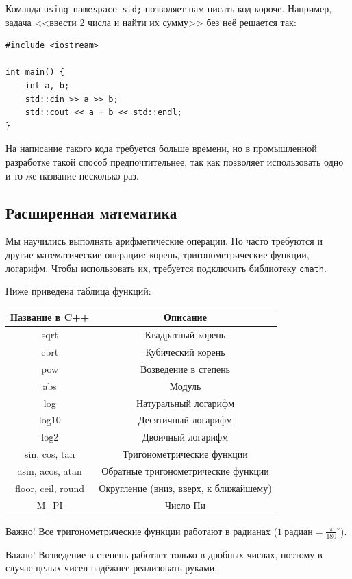 \documentclass{article}
\newcommand{\tabularII}[1]{\begin{center}\begin{tabular}{|c|c|} #1 \end{tabular}\end{center}}
\newcommand{\important}[1]{
	\begin{sectionenv}[red!30!white]{Важно!}
		#1
	\end{sectionenv}
}
\begin{document}
	Команда \texttt{using namespace std;} позволяет нам писать код короче. Например, задача <<ввести 2 числа и найти их сумму>> без неё решается так:
	
	\begin{lstlisting}
#include <iostream>

int main() {
	int a, b;
	std::cin >> a >> b;
	std::cout << a + b << std::endl;
}
	\end{lstlisting}
	
	На написание такого кода требуется больше времени, но в промышленной разработке такой способ предпочтительнее, так как позволяет использовать одно и то же название несколько раз.
	
	\subsection{Расширенная математика}
	
	Мы научились выполнять арифметические операции. Но часто требуются и другие математические операции: корень, тригонометрические функции, логарифм. Чтобы использовать их, требуется подключить библиотеку \texttt{cmath}.
	
	Ниже приведена таблица функций:
	
	\tabularII{
		\hline
		\textbf{Название в C++} & \textbf{Описание}\\
		\hline
		sqrt & Квадратный корень\\
		\hline
		cbrt & Кубический корень\\
		\hline
		pow & Возведение в степень\\
		\hline
		abs & Модуль\\
		\hline
		log & Натуральный логарифм\\
		\hline
		log10 & Десятичный логарифм\\
		\hline
		log2 & Двоичный логарифм\\
		\hline
		sin, cos, tan & Тригонометрические функции\\
		\hline
		asin, acos, atan & Обратные тригонометрические функции\\
		\hline
		floor, ceil, round & Округление (вниз, вверх, к ближайшему)\\
		\hline
		M\_PI & Число Пи\\
		\hline
	}
	
	\important{Все тригонометрические функции работают в радианах ($1\ \text{радиан} = \frac{\pi}{180}^\circ$).}
	
	\important{Возведение в степень работает только в дробных числах, поэтому в случае целых чисел надёжнее реализовать руками.}
	
\end{document}
